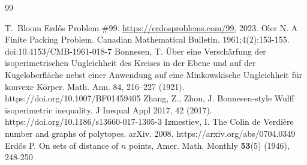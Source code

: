 \documentclass[10pt,reqno]{amsart}
\begin{document}
\begin{thebibliography}{99}

T.~Bloom
\newblock Erd\H{o}s Problem \#99.
\newblock \url{https://erdosproblems.com/99}, 2023.
\newblock [Online]
 Oler N. A Finite Packing Problem. Canadian Mathematical Bulletin. 1961;4(2):153-155. doi:10.4153/CMB-1961-018-7
 Bonnesen, T. Über eine Verschärfung der isoperimetrischen Ungleichheit des Kreises in der Ebene und auf der Kugeloberfläche nebst einer Anwendung auf eine Minkowskische Ungleichheit für konvexe Körper. Math. Ann. 84, 216–227 (1921). https://doi.org/10.1007/BF01459405
 Zhang, Z., Zhou, J. Bonnesen-style Wulff isoperimetric inequality. J Inequal Appl 2017, 42 (2017). https://doi.org/10.1186/s13660-017-1305-3
 Izmestiev, I. The Colin de Verdi\`ere number and graphs of polytopes. arXiv. 2008. https://arxiv.org/abs/0704.0349
 Erd\H{o}s P. On sets of distance of $n$ points, Amer. Math. Monthly \textbf{53}(5) (1946), 248-250

\end{thebibliography}
\end{document}
